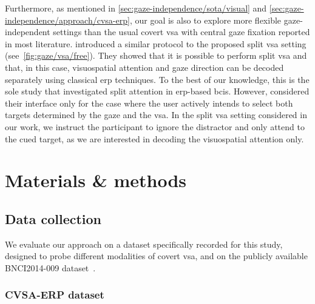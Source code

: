 Furthermore, as mentioned in \cref{sec:gaze-independence/sota/visual} and
\cref{sec:gaze-independence/approach/cvsa-erp},
our goal is also to explore more flexible gaze-independent settings than the
usual covert \ac{vsa} with central gaze fixation reported in most literature.
\textcite{Frenzel2011} introduced a similar protocol to the proposed split
\ac{vsa} setting (see~\cref{fig:gaze/vsa/free}).
They showed that it is possible to perform split \ac{vsa} and that, in this
case, visuospatial attention and gaze direction can be decoded separately using
classical \ac{erp} techniques.
To the best of our
knowledge, this is the sole study that investigated split attention in \ac{erp}-based \acp{bci}.
However, \textcite{Frenzel2011} considered their interface only for the case
where the user actively intends to select both targets determined by the gaze
and the \ac{vsa}.
In the split \ac{vsa} setting considered in our work, we instruct the participant to ignore
the distractor and only attend to the cued target, as we are interested in
decoding the visuospatial attention only.

\section{Materials \& methods}

\subsection{Data collection}
We evaluate our approach on a dataset specifically recorded for this study, designed to
probe different modalities of covert \ac{vsa}, and on the publicly available
BNCI2014-009 dataset~\cite{Aloise2012a}.

\subsubsection{CVSA-ERP dataset}%
\label{sec:covert-align/stimulation}

